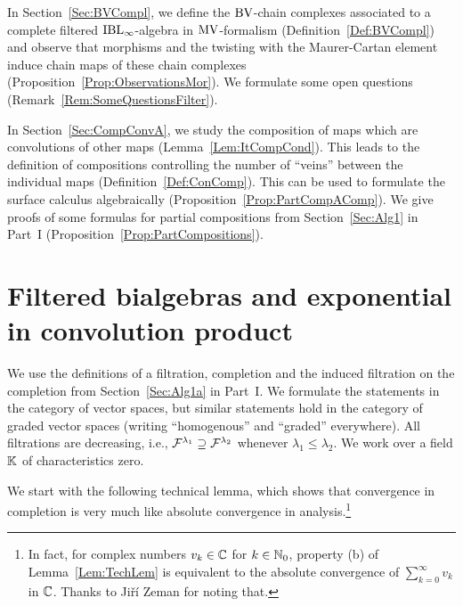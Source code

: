 \documentclass[\MainFolder/Text.tex]{subfiles}
\begin{document}
In Section~\ref{Sec:BVCompl}, we define the $\mathrm{BV}$-chain complexes associated to a complete filtered $\mathrm{IBL}_\infty$-algebra in $\mathrm{MV}$-formalism (Definition~\ref{Def:BVCompl}) and observe that morphisms and the twisting with the Maurer-Cartan element induce chain maps of these chain complexes (Proposition~\ref{Prop:ObservationsMor}). We formulate some open questions (Remark~\ref{Rem:SomeQuestionsFilter}).

In Section~\ref{Sec:CompConvA}, we study the composition of maps which are convolutions of other maps (Lemma~\ref{Lem:ItCompCond}). This leads to the definition of compositions controlling the number of ``veins'' between the individual maps (Definition~\ref{Def:ConComp}). This can be used to formulate the surface calculus algebraically (Proposition~\ref{Prop:PartCompAComp}). We give proofs of some formulas for partial compositions from Section~\ref{Sec:Alg1} in Part~I (Proposition~\ref{Prop:PartCompositions}).


\section{Filtered bialgebras and exponential in convolution product}\label{Sec:DetailsOnFiltr}

We use the definitions of a filtration, completion and the induced filtration on the completion from Section~\ref{Sec:Alg1a} in Part~I. We formulate the statements in the category of vector spaces, but similar statements hold in the category of graded vector spaces (writing ``homogenous'' and ``graded'' everywhere). All filtrations are decreasing, i.e., $\mathcal{F}^{\lambda_1} \supseteq \mathcal{F}^{\lambda_2}$ whenever $\lambda_1 \le \lambda_2$.
We work over a field $\mathbb{K}$ of characteristics zero.

We start with the following technical lemma, which shows that convergence in completion is very much like absolute convergence in analysis.\footnote{In fact, for complex numbers $v_k\in \mathbb{C}$ for $k\in\mathbb{N}_0$, property (b) of Lemma~\ref{Lem:TechLem} is equivalent to the absolute convergence of $\sum_{k=0}^\infty v_k$ in $\mathbb{C}$.
Thanks to Ji\v r\'i Zeman for noting that.}
 
\end{document}
